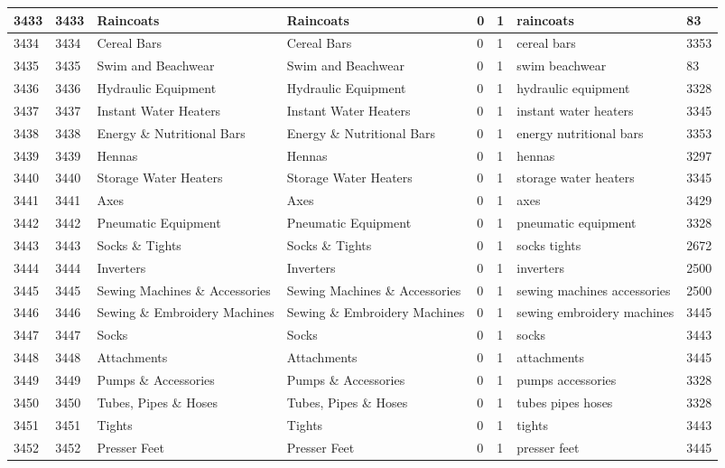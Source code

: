 \begin{longtable}{|l|l|l|l|l|l|l|l|}
3433 & 3433 & Raincoats & Raincoats & 0 & 1 & raincoats & 83 \\ \hline 
3434 & 3434 & Cereal Bars & Cereal Bars & 0 & 1 & cereal bars & 3353 \\ \hline 
3435 & 3435 & Swim and Beachwear & Swim and Beachwear & 0 & 1 & swim beachwear & 83 \\ \hline 
3436 & 3436 & Hydraulic Equipment & Hydraulic Equipment & 0 & 1 & hydraulic equipment & 3328 \\ \hline 
3437 & 3437 & Instant Water Heaters & Instant Water Heaters & 0 & 1 & instant water heaters & 3345 \\ \hline 
3438 & 3438 & Energy \& Nutritional Bars & Energy \& Nutritional Bars & 0 & 1 & energy nutritional bars & 3353 \\ \hline 
3439 & 3439 & Hennas & Hennas & 0 & 1 & hennas & 3297 \\ \hline 
3440 & 3440 & Storage Water Heaters & Storage Water Heaters & 0 & 1 & storage water heaters & 3345 \\ \hline 
3441 & 3441 & Axes & Axes & 0 & 1 & axes & 3429 \\ \hline 
3442 & 3442 & Pneumatic Equipment & Pneumatic Equipment & 0 & 1 & pneumatic equipment & 3328 \\ \hline 
3443 & 3443 & Socks \& Tights & Socks \& Tights & 0 & 1 & socks tights & 2672 \\ \hline 
3444 & 3444 & Inverters & Inverters & 0 & 1 & inverters & 2500 \\ \hline 
3445 & 3445 & Sewing Machines \& Accessories & Sewing Machines \& Accessories & 0 & 1 & sewing machines accessories & 2500 \\ \hline 
3446 & 3446 & Sewing \& Embroidery Machines & Sewing \& Embroidery Machines & 0 & 1 & sewing embroidery machines & 3445 \\ \hline 
3447 & 3447 & Socks & Socks & 0 & 1 & socks & 3443 \\ \hline 
3448 & 3448 & Attachments & Attachments & 0 & 1 & attachments & 3445 \\ \hline 
3449 & 3449 & Pumps \& Accessories & Pumps \& Accessories & 0 & 1 & pumps accessories & 3328 \\ \hline 
3450 & 3450 & Tubes, Pipes \& Hoses & Tubes, Pipes \& Hoses & 0 & 1 & tubes pipes hoses & 3328 \\ \hline 
3451 & 3451 & Tights & Tights & 0 & 1 & tights & 3443 \\ \hline 
3452 & 3452 & Presser Feet & Presser Feet & 0 & 1 & presser feet & 3445 \\ \hline 

\end{longtable}
